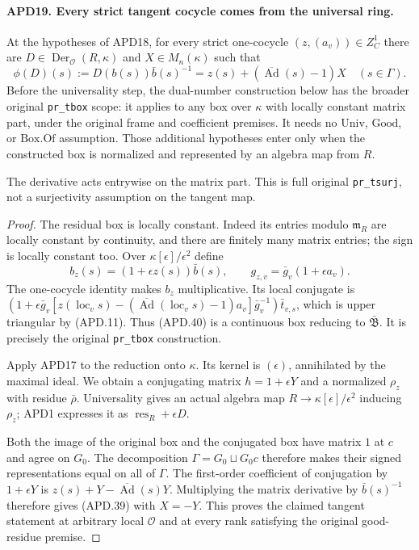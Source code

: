 \paragraph{APD19. Every strict tangent cocycle comes from the universal ring.}
\label{claim:APD19}
At the hypotheses of APD18, for every strict one-cocycle
\((z,(a_v))\in Z_C^1\) there are
\(D\in\operatorname{Der}_{\mathcal O}(R,\kappa)\) and
\(X\in M_n(\kappa)\) such that
\[
 \phi(D)(s):=D(b(s))\bar b(s)^{-1}
              =z(s)+(\overline{\operatorname{Ad}}(s)-1)X
                         \quad(s\in\Gamma).             \tag{APD.39}
\]
Before the universality step, the dual-number construction below
has the broader original \texttt{pr\_tbox} scope: it applies to
any box over \(\kappa\) with locally constant matrix part,
under the original frame and coefficient premises.  It needs no
\(\mathrm{Univ}\), \(\mathrm{Good}\), or
\(\mathrm{Box.Of}\) assumption.  Those additional hypotheses
enter only when the constructed box is normalized and represented
by an algebra map from \(R\).

The derivative acts entrywise on the matrix part.  This is full
original \texttt{pr\_tsurj}, not a surjectivity assumption on
the tangent map.

\begin{proof}
The residual box is locally constant.  Indeed its entries modulo
\(\mathfrak m_R\) are locally constant by continuity, and
there are finitely many matrix entries; the sign is locally
constant too.  Over \(\kappa[\epsilon]/\epsilon^2\) define
\[
 b_z(s)=(1+\epsilon z(s))\bar b(s),
 \qquad g_{z,v}=\bar g_v(1+\epsilon a_v).                  \tag{APD.40}
\]
The one-cocycle identity makes \(b_z\) multiplicative.  Its
local conjugate is
\((1+\epsilon\bar g_v[z(\operatorname{loc}_v s)
 -(\overline{\operatorname{Ad}}(\operatorname{loc}_v s)-1)a_v]
 \bar g_v^{-1})\bar t_{v,s}\), which is upper triangular
by (APD.11).  Thus (APD.40) is a continuous box reducing to
\(\bar{\mathfrak B}\).  It is precisely the original
\texttt{pr\_tbox} construction.

Apply APD17 to the reduction onto \(\kappa\).  Its kernel is
\((\epsilon)\), annihilated by the maximal ideal.  We obtain
a conjugating matrix \(h=1+\epsilon Y\) and a normalized
\(\rho_z\) with residue \(\bar\rho\).  Universality gives
an actual algebra map \(R\to\kappa[\epsilon]/\epsilon^2\)
inducing \(\rho_z\); APD1 expresses it as
\(\operatorname{res}_R+\epsilon D\).

Both the image of the original box and the conjugated box have
matrix \(1\) at \(c\) and agree on \(G_0\).  The decomposition
\(\Gamma=G_0\sqcup G_0c\) therefore makes their signed
representations equal on all of \(\Gamma\).  The first-order
coefficient of conjugation by \(1+\epsilon Y\) is
\(z(s)+Y-\overline{\operatorname{Ad}}(s)Y\).
Multiplying the matrix derivative by \(\bar b(s)^{-1}\)
therefore gives (APD.39) with \(X=-Y\).  This proves the
claimed tangent statement at arbitrary local \(\mathcal O\)
and at every rank satisfying the original good-residue premise.
\end{proof}

